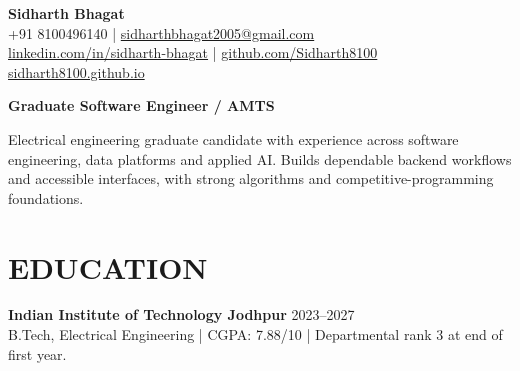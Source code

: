 \documentclass[10pt,a4paper]{article}
\begin{document}
\fontsize{9}{12.2}\selectfont
\begin{center}
{\fontsize{23}{26}\selectfont\bfseries Sidharth Bhagat}\\[4pt]
+91 8100496140 | \href{mailto:sidharthbhagat2005@gmail.com}{sidharthbhagat2005@gmail.com}\\
\href{https://www.linkedin.com/in/sidharth-bhagat/}{linkedin.com/in/sidharth-bhagat} | \href{https://github.com/Sidharth8100}{github.com/Sidharth8100}\\
\href{https://sidharth8100.github.io}{sidharth8100.github.io}
\end{center}
\textbf{Graduate Software Engineer / AMTS}\par
Electrical engineering graduate candidate with experience across software engineering, data platforms and applied AI. Builds dependable backend workflows and accessible interfaces, with strong algorithms and competitive-programming foundations.
\section*{EDUCATION}
\textbf{Indian Institute of Technology Jodhpur} \hfill 2023--2027\\
B.Tech, Electrical Engineering | CGPA: 7.88/10 | Departmental rank 3 at end of first year.
\end{document}
